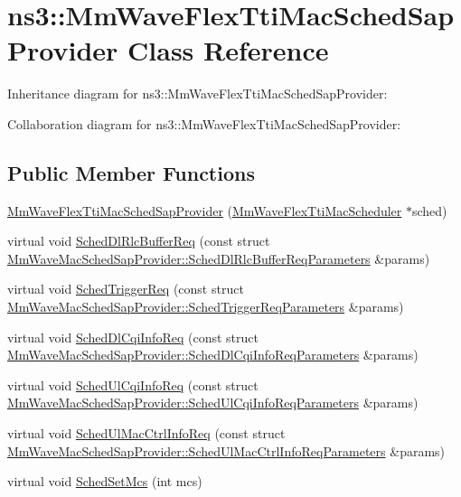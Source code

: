 \hypertarget{classns3_1_1MmWaveFlexTtiMacSchedSapProvider}{}\section{ns3\+:\+:Mm\+Wave\+Flex\+Tti\+Mac\+Sched\+Sap\+Provider Class Reference}
\label{classns3_1_1MmWaveFlexTtiMacSchedSapProvider}


Inheritance diagram for ns3\+:\+:Mm\+Wave\+Flex\+Tti\+Mac\+Sched\+Sap\+Provider\+:


Collaboration diagram for ns3\+:\+:Mm\+Wave\+Flex\+Tti\+Mac\+Sched\+Sap\+Provider\+:
\subsection*{Public Member Functions}
\begin{DoxyCompactItemize}
\item 
\hyperlink{classns3_1_1MmWaveFlexTtiMacSchedSapProvider_abd291c5106859606afb7a2a4c9d4c9e1}{Mm\+Wave\+Flex\+Tti\+Mac\+Sched\+Sap\+Provider} (\hyperlink{classns3_1_1MmWaveFlexTtiMacScheduler}{Mm\+Wave\+Flex\+Tti\+Mac\+Scheduler} $\ast$sched)
\item 
virtual void \hyperlink{classns3_1_1MmWaveFlexTtiMacSchedSapProvider_ae04f370a7693a8f631f3c6cf8942199c}{Sched\+Dl\+Rlc\+Buffer\+Req} (const struct \hyperlink{structns3_1_1MmWaveMacSchedSapProvider_1_1SchedDlRlcBufferReqParameters}{Mm\+Wave\+Mac\+Sched\+Sap\+Provider\+::\+Sched\+Dl\+Rlc\+Buffer\+Req\+Parameters} \&params)
\item 
virtual void \hyperlink{classns3_1_1MmWaveFlexTtiMacSchedSapProvider_abfaeae4decf849c60ceebef39374b805}{Sched\+Trigger\+Req} (const struct \hyperlink{structns3_1_1MmWaveMacSchedSapProvider_1_1SchedTriggerReqParameters}{Mm\+Wave\+Mac\+Sched\+Sap\+Provider\+::\+Sched\+Trigger\+Req\+Parameters} \&params)
\item 
virtual void \hyperlink{classns3_1_1MmWaveFlexTtiMacSchedSapProvider_a65dd236e851a42a69a214039d35a84d2}{Sched\+Dl\+Cqi\+Info\+Req} (const struct \hyperlink{structns3_1_1MmWaveMacSchedSapProvider_1_1SchedDlCqiInfoReqParameters}{Mm\+Wave\+Mac\+Sched\+Sap\+Provider\+::\+Sched\+Dl\+Cqi\+Info\+Req\+Parameters} \&params)
\item 
virtual void \hyperlink{classns3_1_1MmWaveFlexTtiMacSchedSapProvider_a6042b96cd5f9e546af93b1d9831e48b2}{Sched\+Ul\+Cqi\+Info\+Req} (const struct \hyperlink{structns3_1_1MmWaveMacSchedSapProvider_1_1SchedUlCqiInfoReqParameters}{Mm\+Wave\+Mac\+Sched\+Sap\+Provider\+::\+Sched\+Ul\+Cqi\+Info\+Req\+Parameters} \&params)
\item 
virtual void \hyperlink{classns3_1_1MmWaveFlexTtiMacSchedSapProvider_ac271366f91934c8cc847f266034bd074}{Sched\+Ul\+Mac\+Ctrl\+Info\+Req} (const struct \hyperlink{structns3_1_1MmWaveMacSchedSapProvider_1_1SchedUlMacCtrlInfoReqParameters}{Mm\+Wave\+Mac\+Sched\+Sap\+Provider\+::\+Sched\+Ul\+Mac\+Ctrl\+Info\+Req\+Parameters} \&params)
\item 
virtual void \hyperlink{classns3_1_1MmWaveFlexTtiMacSchedSapProvider_a7f972b563097542678554c39b70d25aa}{Sched\+Set\+Mcs} (int mcs)
\end{DoxyCompactItemize}
